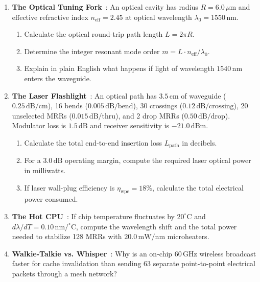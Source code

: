 \begin{enumerate}
    \item \textbf{The Optical Tuning Fork}~\cite{Little1997,Kao2026}: An optical cavity has radius $R = 6.0\,\mu\mathrm{m}$ and effective refractive index $n_{\mathrm{eff}} = 2.45$ at optical wavelength $\lambda_0 = 1550\,\mathrm{nm}$.
    \begin{enumerate}
        \item Calculate the optical round-trip path length $L = 2 \pi R$.
        \item Determine the integer resonant mode order $m = L \cdot n_{\mathrm{eff}} / \lambda_0$.
        \item Explain in plain English what happens if light of wavelength $1540\,\mathrm{nm}$ enters the waveguide.
    \end{enumerate}

    \item \textbf{The Laser Flashlight}~\cite{Vantrease2008,Kao2026,Ye2013}: An optical path has $3.5\,\mathrm{cm}$ of waveguide ($0.25\,\mathrm{dB/cm}$), 16 bends ($0.005\,\mathrm{dB/bend}$), 30 crossings ($0.12\,\mathrm{dB/crossing}$), 20 unselected MRRs ($0.015\,\mathrm{dB/thru}$), and 2 drop MRRs ($0.50\,\mathrm{dB/drop}$). Modulator loss is $1.5\,\mathrm{dB}$ and receiver sensitivity is $-21.0\,\mathrm{dBm}$.
    \begin{enumerate}
        \item Calculate the total end-to-end insertion loss $L_{\mathrm{path}}$ in decibels.
        \item For a $3.0\,\mathrm{dB}$ operating margin, compute the required laser optical power in milliwatts.
        \item If laser wall-plug efficiency is $\eta_{\mathrm{wpe}} = 18\%$, calculate the total electrical power consumed.
    \end{enumerate}

    \item \textbf{The Hot CPU}~\cite{Ye2013,Wang2021ACO}: If chip temperature fluctuates by $20^\circ\mathrm{C}$ and $d\lambda / dT = 0.10\,\mathrm{nm/^\circ C}$, compute the wavelength shift and the total power needed to stabilize 128 MRRs with $20.0\,\mathrm{mW/nm}$ microheaters.

    \item \textbf{Walkie-Talkie vs. Whisper}~\cite{Deb2012,Abadal2018,Taghvaee2022}: Why is an on-chip $60\,\mathrm{GHz}$ wireless broadcast faster for cache invalidation than sending 63 separate point-to-point electrical packets through a mesh network?
\end{enumerate}

